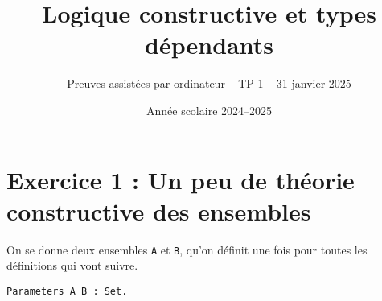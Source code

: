 \documentclass{article}
\begin{document}
\title{Logique constructive et types dépendants}
\author{Preuves assistées par ordinateur -- TP 1 -- 31 janvier 2025}
\date{Année scolaire 2024--2025}
\maketitle

\section*{Exercice 1 : Un peu de théorie constructive des ensembles}

On se donne deux ensembles \texttt{A} et \texttt{B},
qu'on définit une fois pour toutes les définitions qui vont suivre.

\begin{verbatim}
Parameters A B : Set.
\end{verbatim}
\end{document}
